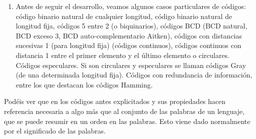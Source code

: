 \begin{enumerate}
\begin{enumerate}
    mayúsculas, unido a la tilde y la diéresis cómo el conjunto de
    palabras del diccionario de la Real Academia de la Lengua,
    represen\-tando una palabra con una diéresis como cigüeña como
    ``cig\#ueña'', y si lleva una til\-de como en Julián como
    ``Juli\textasciitilde an''. Un nombre más habitual que el de
    lenguaje en electrónica suele ser el de código.
  \item
    Antes de seguir el desarrollo, veamos algunos casos particulares de
    códigos: código binario natural de cualquier longitud, código
    binario natural de longitud fija, códigos 5 entre 2 (o biquinarios),
    códigos BCD (BCD natural, BCD exceso 3, BCD auto-complementario
    Aitken), códigos con distancias sucesivas 1 (para longitud fija)
    (códigos continuos), códigos continuos con distancia 1 entre el
    primer elemento y el último elemento o circulares. Códigos
    especulares. Si son circulares y especulares se llaman códigos Gray
    (de una determinada longitud fija). Códigos con redundancia de
    infor\-mación, entre los que destacan los códigos Hamming.
  \end{enumerate}
\end{enumerate}

Podéis ver que en los códigos antes explicitados y sus propiedades hacen
referencia necesaria a algo más que al conjunto de las palabras de un
lenguaje, que se puede re\-sumir en un orden en las palabras. Esto viene
dado normalmente por el significado de las palabras.

